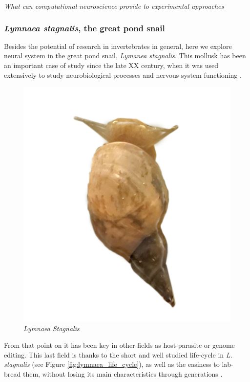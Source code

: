 \textit{What can computational neuroscience provide to experimental approaches}



\subsubsection{\textit{Lymnaea stagnalis}, the great pond snail}
Besides the potential of research in invertebrates in general, here we explore neural system in the great pond snail, \textit{Lymanea stagnalis}. This mollusk has been an important case of study since the late XX century, when it was used extensively to study neurobiological processes and nervous system functioning \parencite{Benjamin1979a}. %

\begin{figure}
	\centering
	\includegraphics[width=0.7\linewidth]{img/intro/lymnaea.png} 
	\caption{\textit{Lymnaea Stagnalis}}
	\label{fig:snail}
\end{figure}  From that point on it has been key in other fields as host-parasite or genome editing. This last field is thanks to the short and well studied life-cycle in \textit{L. stagnalis} (see Figure \ref{fig:lymnaea_life_cycle}), as well as the easiness to lab-bread them, without losing its main characteristics through generations \parencite{noland_observations_1946}. 


